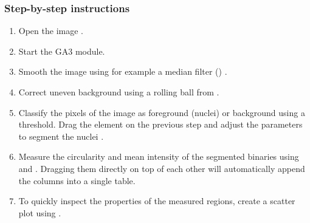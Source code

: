 \subsubsection*{Step-by-step instructions}
\begin{enumerate}
    \item Open the image .
    \item Start the GA3 module.
    \item Smooth the image using for example a median filter () 
    .
    \item Correct uneven background using a rolling ball from  
    .
    \item Classify the pixels of the image as foreground (nuclei) or background using a threshold. Drag the element  on the previous step and adjust the parameters to segment the nuclei 
    .
    \item Measure the circularity and mean intensity of the segmented binaries using  and . Dragging them directly on top of each other will automatically append the columns into a single table.
    \item To quickly inspect the properties of the measured regions, create a scatter plot using .
\end{enumerate}

